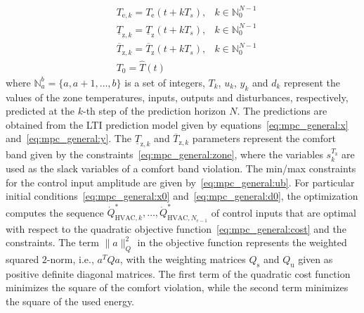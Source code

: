 \documentclass[10pt]{extarticle}
\begin{document}
\begin{subequations}
\begin{align}
   & T_{\text{e},k} = T_{\text{e}}(t+ k T_s), & k \in \mathbb{N}_{0}^{N-1} \label{eq:mpc_general:d0} \\
  & \underline{T}_{\text{z},k} =  \underline{T}_{\text{z}}(t+ k T_s), & k \in \mathbb{N}_{0}^{N-1} \label{eq:mpc_general:r_low} \\
    & \overline{T}_{\text{z},k} =  \overline{T}_{\text{z}}(t+ k T_s), & k \in \mathbb{N}_{0}^{N-1} \label{eq:mpc_general:r_up} \\
  & T_0 = \hat{T}(t) \label{eq:mpc_general:x0}
\end{align}
\end{subequations}
where $\mathbb{N}_a^b = \{a, a+1, \ldots, b \}$ is a set of integers,
$T_k$, $u_k$, $y_k$ and $d_k$ represent the values of the zone temperatures, 
inputs, outputs and disturbances, respectively, 
predicted at the $k$-th step of the prediction horizon $N$.
The predictions are obtained from the LTI prediction
model given by equations~\eqref{eq:mpc_general:x} and~\eqref{eq:mpc_general:y}.
The $\underline{T}_{\text{z},k}$ and $\overline{T}_{\text{z},k}$ parameters represent the comfort band 
given by the constraints~\eqref{eq:mpc_general:zone},
where the variables $s^{T_{\text{z}}}_k$ are used as the slack variables of a comfort band violation.
The min/max constraints for the control input amplitude are given by~\eqref{eq:mpc_general:ub}.
For particular initial conditions~\eqref{eq:mpc_general:x0} and~\eqref{eq:mpc_general:d0}, 
 the optimization computes the sequence $\dot{Q}_{\text{HVAC},k}^*, \ldots, \dot{Q}_{\text{HVAC},N_{\text{c}-1}}^*$ of control inputs that
are optimal with respect to the quadratic objective function~\eqref{eq:mpc_general:cost}
and the constraints.
The term $\|a\|_Q^2$ in the objective function represents the weighted squared $2$-norm, i.e., $a^T Q a$,
with the weighting matrices $Q_\text{s}$ and $Q_\text{u}$ given as positive 
definite diagonal matrices.
The first term of the quadratic cost function minimizes the square of the comfort violation,
while the second term minimizes the square of the used energy.
\end{document}
